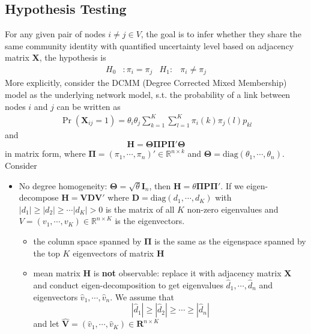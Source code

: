 \documentclass[twoside]{article}
\begin{document}
\subsection{Hypothesis Testing}
For any given pair of nodes $i\neq j\in V$, the goal is to infer whether they share the same community identity with quantified uncertainty level based on adjacency matrix $\mathbf{X}$, the hypothesis is
\begin{align*}
    H_0 &: \pi_i=\pi_j & H_1: &\pi_i\neq \pi_j
\end{align*}
More explicitly, consider the DCMM (Degree Corrected Mixed Membership) model as the underlying network model, s.t. the probability of a link between nodes $i$ and $j$ can be written as 
\begin{align*}
    \Pr(\mathbf{X}_{ij}=1) = \theta_i \theta_j \sum^K_{k=1}\sum^K_{l=1}\pi_i(k)\pi_j(l)p_{kl}
\end{align*}
and 
$$
\mathbf{H} = \boldsymbol{\Theta\Pi}\mathbf{P}\boldsymbol{\Pi'\Theta}
$$
in matrix form, where $\boldsymbol{\Pi} = \left(\pi_1,\cdots,\pi_n\right)'\in \mathbb{R}^{n\times k}$ and $\boldsymbol{\Theta} = \mathrm{diag}\left(\theta_1,\cdots,\theta_n\right)$. Consider 
\begin{itemize}
    \item No degree homogeneity: $\boldsymbol{\Theta} = \sqrt{\theta}\mathbf{I}_n$, then $\mathbf{H} = \theta \boldsymbol{\Pi}\mathbf{P}\boldsymbol{\Pi}'$. If we eigen-decompose $\mathbf{H} = \mathbf{VDV}'$ where $\mathbf{D} = \mathrm{diag}\left(d_1,\cdots,d_K\right)$ with 
    $\left\vert d_1 \right\vert \geq \left\vert d_2 \right\vert \geq \cdots \left\vert d_K \right\vert > 0$ is the matrix of all $K$ non-zero eigenvalues and $V=\left(v_1,\cdots, v_K\right)\in \mathbb{R}^{n\times K}$ is the eigenvectors.
    \begin{itemize}
        \item the column space spanned by $\boldsymbol{\Pi}$ is the same as the eigenspace spanned by the top $K$ eigenvectors of matrix $\mathbf{H}$
        \item mean matrix $\mathbf{H}$ is \textbf{not} observable: replace it with adjacency matrix $\mathbf{X}$ and conduct eigen-decomposition to get eigenvalues $\hat{d}_1,\cdots,\hat{d}_n$ and eigenvectors $\hat{v}_1,\cdots,\hat{v}_n$. We assume that 
        $$ \left\vert \hat{d}_1 \right\vert \geq \left\vert \hat{d}_2 \right\vert \geq \cdots \geq \left\vert \hat{d}_n \right\vert $$
        and let $\hat{\mathbf{V}} = \left(\hat{v}_1,\cdots,\hat{v}_K\right) \in \mathbf{R}^{n\times K}$
    \end{itemize}
\end{itemize}

\newpage


\end{document}
